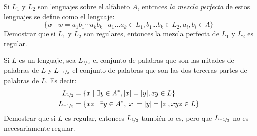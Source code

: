 \begin{ejercicio} \label{ej:1.3.37}
    Si $L_1$ y $L_2$ son lenguajes sobre el alfabeto $A$, entonces \emph{la mezcla perfecta} de estos lenguajes se define como el lenguaje:
    \begin{equation*}
        \{w\mid w=a_1b_1\cdots a_kb_k \mid  a_1\ldots a_k\in L_1, b_1\ldots b_k\in L_2, a_i,b_i\in A\}
    \end{equation*}
    Demostrar que si $L_1$ y $L_2$ son regulares, entonces la mezcla perfecta de $L_1$ y $L_2$ es regular.
\end{ejercicio}

\begin{ejercicio}\label{ej:1.3.38}
    Si $L$ es un lenguaje, sea $L_{\nicefrac{1}{2}}$ el conjunto de palabras que son las mitades de palabras de $L$ y $L_{\nicefrac{-1}{3}}$ el conjunto de palabras que son las dos terceras partes de palabras de $L$. Es decir:
    \begin{align*}
        L_{\nicefrac{1}{2}} &= \{x\mid \exists y\in A^\ast, |x|=|y|, xy\in L\} \\
        L_{\nicefrac{-1}{3}} &= \{xz\mid \exists y\in A^\ast, |x|=|y|=|z|, xyz\in L\}
    \end{align*}
    Demostrar que si $L$ es regular, entonces $L_{\nicefrac{1}{2}}$ también lo es, pero que $L_{\nicefrac{-1}{3}}$ no es necesariamente regular.
\end{ejercicio}

